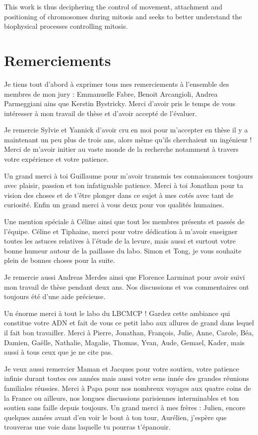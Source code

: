 \documentclass[12pt,a4paper,twoside,openright]{book}
\begin{document}
This work is thus deciphering the control of movement, attachment and
positioning of chromosomes during mitosis and seeks to better understand
the biophysical processes controlling mitosis.

\cleardoublepage
\clearpage\null

\section*{Remerciements}

Je tiens tout d'abord à exprimer tous mes remerciements à l'ensemble des
membres de mon jury : Emmanuelle Fabre, Benoit Arcangioli, Andrea
Parmeggiani ains que Kerstin Bystricky. Merci d'avoir pris le temps de
vous intéresser à mon travail de thèse et d'avoir accepté de l'évaluer.

Je remercie Sylvie et Yannick d'avoir cru en moi pour m'accepter en
thèse il y a maintenant un peu plus de trois ans, alors même qu'ils
cherchaient un ingénieur ! Merci de m'avoir initier au vaste monde de la
recherche notamment à travers votre expérience et votre patience.

Un grand merci à toi Guillaume pour m'avoir transmis tes connaissances
toujours avec plaisir, passion et ton infatiguable patience. Merci à toi
Jonathan pour ta vision des choses et de t'être plonger dans ce sujet à
mes cotés avec tant de curiosité. Enfin un grand merci à vous deux pour
vos qualités humaines.

Une mention spéciale à Céline ainsi que tout les membres présents et
passés de l'équipe. Céline et Tiphaine, merci pour votre dédication à
m'avoir enseigner toutes les astuces relatives à l'étude de la levure,
mais aussi et surtout votre bonne humeur autour de la paillasse du labo.
Simon et Tong, je vous souhaite plein de bonnes choses pour la suite.

Je remercie aussi Andreas Merdes ainsi que Florence Larminat pour avoir
suivi mon travail de thèse pendant deux ans. Nos discussions et vos
commentaires ont toujours été d'une aide précieuse.

Un énorme merci à tout le labo du LBCMCP ! Gardez cette ambiance qui
constitue votre ADN et fait de vous ce petit labo aux allures de grand
dans lequel il fait bon travailler. Merci à Pierre, Jonathan, François,
Julie, Anne, Carole, Béa, Damien, Gaëlle, Nathalie, Magalie, Thomas,
Yvan, Aude, Gemael, Kader, mais aussi à tous ceux que je ne cite pas.

Je veux aussi remercier Maman et Jacques pour votre soutien, votre
patience infinie durant toutes ces années mais aussi votre sens innée
des grandes réunions familiales réussies. Merci à Papa pour nos nombreux
voyages aux quatre coins de la France ou ailleurs, nos longues
discussions parisiennes interminables et ton soutien sans faille depuis
toujours. Un grand merci à mes frères : Julien, encore quelques années
avant d'en voir le bout à ton tour, Aurélien, j'espère que trouveras une
voie dans laquelle tu pourras t'épanouir.
\end{document}

